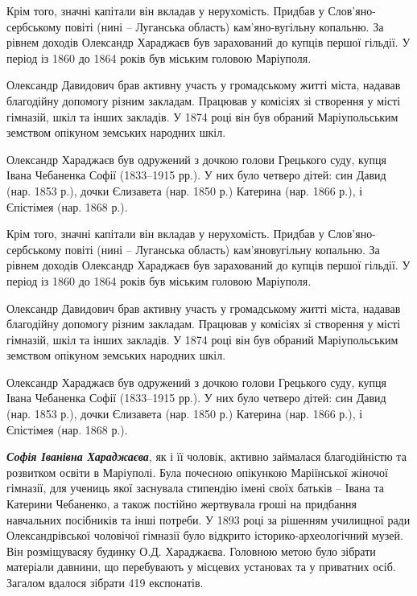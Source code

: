 Крім того, значні капітали він вкладав у нерухомість. Придбав у
Слов'яно-сербському повіті (нині – Луганська область) кам'яно\hyp{}вугільну копальню.
За рівнем доходів Олександр Хараджаєв був зарахований до купців першої гільдії.
У період із 1860 до 1864 років був міським головою Маріуполя.

Олександр Давидович брав активну участь у громадському житті міста, надавав
благодійну допомогу різним закладам. Працював у комісіях зі створення у місті
гімназій, шкіл та інших закладів. У 1874 році він був обраний Маріупольським
земством опікуном земських народних шкіл.

Олександр Хараджаєв був одружений з дочкою голови Грецького суду, купця Івана
Чебаненка Софії (1833–1915 рр.). У них було четверо дітей: син Давид (нар. 1853
р.), дочки Єлизавета (нар. 1850 р.) Катерина (нар. 1866 р.), і Єпістімея (нар.
1868 р.).

Крім того, значні капітали він вкладав у нерухомість. Придбав у
Слов'яно-сербському повіті (нині – Луганська область) кам'яновугільну копальню.
За рівнем доходів Олександр Хараджаєв був зарахований до купців першої гільдії.
У період із 1860 до 1864 років був міським головою Маріуполя.

Олександр Давидович брав активну участь у громадському житті міста, надавав
благодійну допомогу різним закладам. Працював у комісіях зі створення у місті
гімназій, шкіл та інших закладів. У 1874 році він був обраний Маріупольським
земством опікуном земських народних шкіл.

Олександр Хараджаєв був одружений з дочкою голови Грецького суду, купця Івана
Чебаненка Софії (1833–1915 рр.). У них було четверо дітей: син Давид (нар. 1853
р.), дочки Єлизавета (нар. 1850 р.) Катерина (нар. 1866 р.), і Єпістімея (нар.
1868 р.).


\textbf{\emph{Софія Іванівна Хараджаєва}}, як і її чоловік, активно займалася благодійністю та
розвитком освіти в Маріуполі. Була почесною опікункою Маріїнської жіночої
гімназії, для учениць якої заснувала стипендію імені своїх батьків – Івана та
Катерини Чебаненко, а також постійно жертвувала гроші на придбання навчальних
посібників та інші потреби. У 1893 році за рішенням училищної ради
Олександрівської чоловічої гімназії було відкрито історико-археологічний музей.
Він розміщувасяу будинку О.Д. Хараджаєва. Головною метою було зібрати матеріали
давнини, що перебувають у місцевих установах та у приватних осіб. Загалом
вдалося зібрати 419 експонатів.

